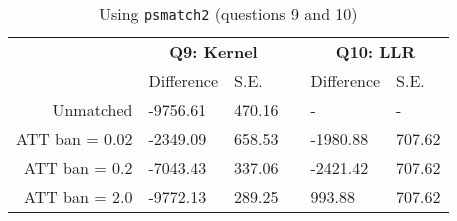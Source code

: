 \begin{table}[h!]
\caption{Using \texttt{psmatch2} (questions 9 and 10)}
	\label{q10}
\begin{center}
\begin{tabular}{rlllll}
\toprule
& \multicolumn{2}{c}{\textbf{Q9: Kernel}} && \multicolumn{2}{c}{\textbf{Q10: LLR}}\\ 
& Difference & S.E. && Difference & S.E. \\
\addlinespace
\hline
\addlinespace
Unmatched & -9756.61 &  470.16 && - & - \\ \addlinespace 
ATT ban = 0.02 & -2349.09 &  658.53 && -1980.88 &  707.62 \\
ATT ban = 0.2 & -7043.43 &  337.06 && -2421.42 &  707.62 \\
ATT ban = 2.0 & -9772.13 &  289.25 &&  993.88 &  707.62 \\
\bottomrule
\end{tabular}
\end{center}
\end{table}
